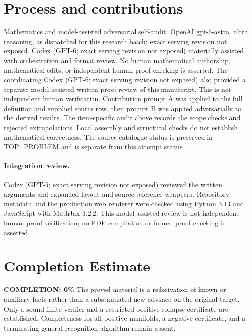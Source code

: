 \documentclass[11pt]{article}
\begin{document}
\section{Process and contributions}
Mathematics and model-assisted adversarial self-audit: OpenAI gpt-6-astra, ultra reasoning, as dispatched for this research batch; exact serving revision not exposed. Codex (GPT-6; exact serving revision not exposed) materially assisted with orchestration and format review. No human mathematical authorship, mathematical edits, or independent human proof checking is asserted.
The coordinating Codex (GPT-6; exact serving revision not exposed) also provided a separate model-assisted written-proof review of this manuscript. This is not independent human verification.
Contribution prompt A was applied to the full definition and supplied source row, then prompt B was applied adversarially to the derived results. The item-specific audit above records the scope checks and rejected extrapolations. Local assembly and structural checks do not establish mathematical correctness. The source catalogue status is preserved in TOP\_PROBLEM and is separate from this attempt status.
\paragraph{Integration review.} Codex (GPT-6; exact serving revision not exposed) reviewed the written arguments and expanded layout and source-reference wrappers. Repository metadata and the production web renderer were checked using Python 3.13 and JavaScript with MathJax 3.2.2. This model-assisted review is not independent human proof verification; no PDF compilation or formal proof checking is asserted.

\section{Completion Estimate}
\noindent\textbf{COMPLETION: 0\%}
The proved material is a rederivation of known or auxiliary facts rather than a substantiated new advance on the original target. Only a sound finite verifier and a restricted positive collapse certificate are established. Completeness for all positive manifolds, a negative certificate, and a terminating general recognition algorithm remain absent.
\end{document}
